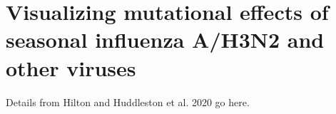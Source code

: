 \chapter{Visualizing mutational effects of seasonal influenza A/H3N2 and other viruses}

Details from Hilton and Huddleston et al. 2020 go here.
